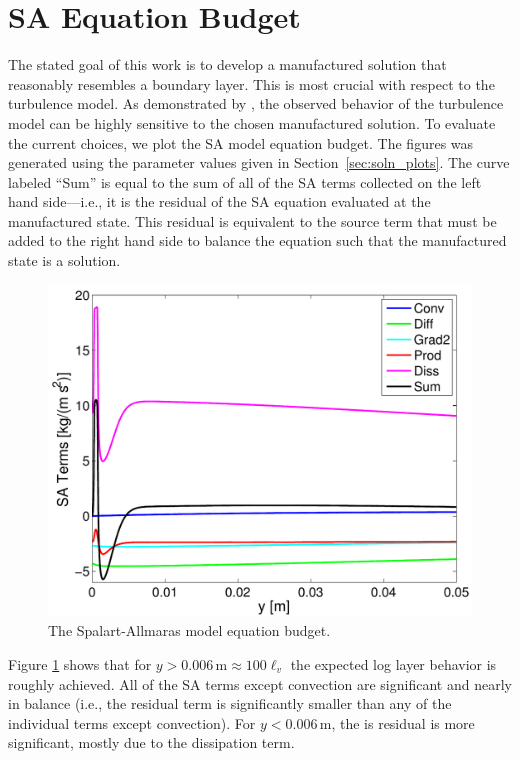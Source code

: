 \section{SA Equation Budget} \label{sec:sa_budget}
The stated goal of this work is to develop a manufactured solution
that reasonably resembles a boundary layer.  This is most crucial with
respect to the turbulence model.  As demonstrated by \citet{Eca2007a}, the
observed behavior of the turbulence model can be highly sensitive to
the chosen manufactured solution.  To evaluate the current choices, we
plot the SA model equation budget.  The figures was generated using
the parameter values given in Section~\ref{sec:soln_plots}.  The curve
labeled ``Sum'' is equal to the sum of all of the SA terms collected
on the left hand side---i.e., it is the residual of the SA equation
evaluated at the manufactured state.  This residual is equivalent
to the source term that must be added to the right hand side to
balance the equation such that the manufactured state is a solution.
%
\begin{figure}[htp]

\begin{center}
\includegraphics[width=0.5\linewidth]{figs/sa_budget.pdf}
\end{center}
\vspace{-15pt}
\caption{The Spalart-Allmaras model equation budget.}\label{fig:sa_budget}
\end{figure}

Figure \ref{fig:sa_budget} shows that for $y > 0.006 \, \mathrm{m} \approx 100
\ell_v$ the expected log layer behavior is roughly achieved.  All of
the SA terms except convection are significant and nearly in balance
(i.e., the residual term is significantly smaller than any of the
individual terms except convection).  For $y < 0.006 \,\mathrm{m}$,
the is residual is more significant, mostly due to the dissipation
term.  


